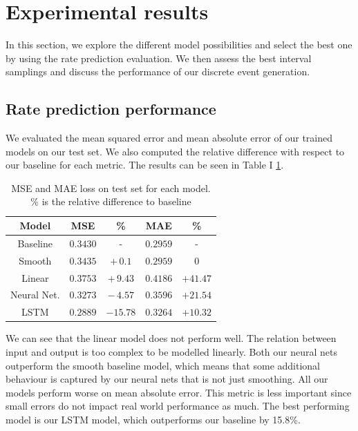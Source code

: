\documentclass[10pt,conference,compsocconf]{IEEEtran}
\begin{document}

\section{Experimental results}

In this section, we explore the different model possibilities and select the best one by using the rate prediction evaluation. We then assess the best interval samplings and discuss the performance of our discrete event generation.

\subsection{Rate prediction performance}

We evaluated the mean squared error and mean absolute error of our trained models on our test set. We 
also computed the relative difference with respect to our baseline for each metric. The results can be seen in Table I \ref{table:ratepred}. 

\begin{table}[h!]
\begin{center}
    \begin{tabular}[c]{| c| c c | c c | }
        \hline
         \textbf{Model} & \textbf{MSE} & \% & \textbf{MAE} & \%\\
         \hline
         Baseline    & $0.3430$ &   -       & $0.2959$ & -\\
         Smooth      & $0.3435$ & $+\,0.1$  & $0.2959$ & $0$ \\
         Linear      & $0.3753$ & $+\,9.43$ & $0.4186$ & $+41.47$ \\
         Neural Net. & $0.3273$ & $-\,4.57$ & $0.3596$ & $+21.54$ \\
         LSTM        & $0.2889$ & $-15.78$  & $0.3264$ & $+10.32$  \\
         \hline
    \end{tabular}
\end{center}
\label{table:ratepred}
\caption{MSE and MAE loss on test set for each model.\\
{\footnotesize \% is the relative difference to baseline}}
\end{table}

We can see that the linear model does not perform well. The relation between input and output is too complex to be modelled linearly. Both our neural nets outperform the smooth baseline model, which means that some additional behaviour is captured by our neural nets that is not just smoothing. All our models perform worse on mean absolute error. This metric is less important since small errors do not impact real world performance as much. The best performing model is our LSTM model, which outperforms our baseline by 15.8\%.
\end{document}
